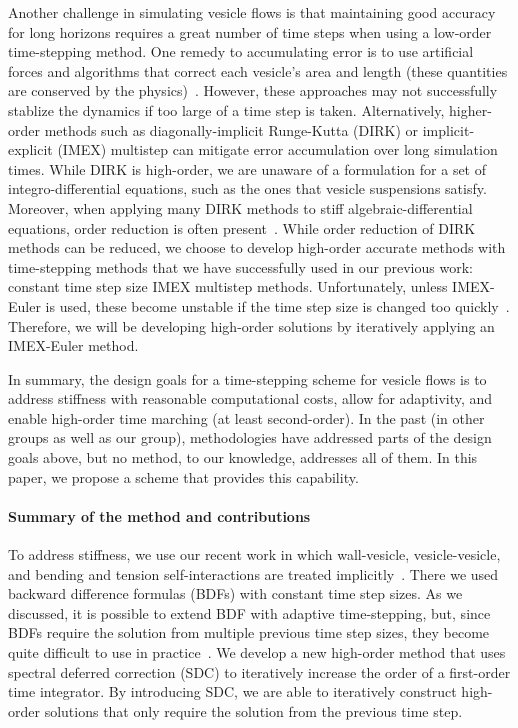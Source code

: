 Another challenge in simulating vesicle flows is that maintaining good
accuracy for long horizons requires a great number of time steps when
using a low-order time-stepping method.  One remedy to accumulating
error is to use artificial forces and algorithms that correct each
vesicle's area and length (these quantities are conserved by the
physics)~\cite{bea:rio:seo:bib:mis2004, bib:mis2003, can:kas:mis2003,
ala:ege:low:voi2014}.  However, these approaches may not successfully
stablize the dynamics if too large of a time step is taken.
Alternatively, higher-order methods such as diagonally-implicit
Runge-Kutta (DIRK) or implicit-explicit (IMEX) multistep can mitigate
error accumulation over long simulation times.  While DIRK is
high-order, we are unaware of a formulation for a set of
integro-differential equations, such as the ones that vesicle
suspensions satisfy.  Moreover, when applying many DIRK methods to
stiff algebraic-differential equations, order reduction is often
present~\cite{bos2007}.  While order reduction of DIRK methods can be
reduced, we choose to develop high-order accurate methods with
time-stepping methods that we have successfully used in our previous
work: constant time step size IMEX multistep methods.  Unfortunately,
unless IMEX-Euler is used, these become unstable if the time step size
is changed too quickly~\cite{dah:lin:nev1983}.  Therefore, we will be
developing high-order solutions by iteratively applying an IMEX-Euler
method.

In summary, the design goals for a time-stepping scheme for vesicle
flows is to address stiffness with reasonable computational costs,
allow for adaptivity, and enable high-order time marching (at least
second-order). In the past (in other groups as well as our group),
methodologies have addressed parts of the design goals above, but no
method, to our knowledge, addresses all of them.  In this paper, we
propose a scheme that provides this capability.

\paragraph{Summary of the method and contributions}
To address stiffness, we use our recent work in which wall-vesicle,
vesicle-vesicle, and bending and tension self-interactions are treated
implicitly~\cite{qua:bir2014b}.  There we used backward difference
formulas (BDFs) with constant time step sizes.  As we discussed, it is
possible to extend BDF with adaptive time-stepping, but, since BDFs
require the solution from multiple previous time step sizes, they
become quite difficult to use in practice~\cite{dah:lin:nev1983}. We
develop a new high-order method that uses spectral deferred correction
(SDC) to iteratively increase the order of a first-order time
integrator.  By introducing SDC, we are able to iteratively construct
high-order solutions that only require the solution from the previous
time step.

